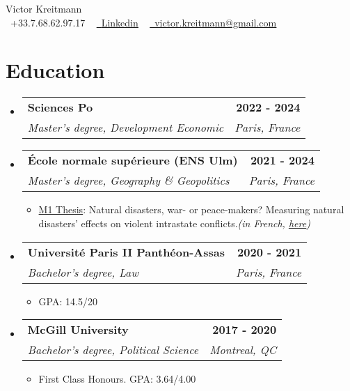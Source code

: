 \documentclass[a4paper,11pt]{article}
\makeatletter
\newcommand{\resumeItem}[1]{
  \item\small{
    {#1 \vspace{-2pt}}
  }
}
\newcommand{\resumeSubheading}[4]{
  \vspace{-2pt}\item
    \begin{tabular*}{1.00\textwidth}[t]{l@{\extracolsep{\fill}}r}
      \textbf{{\small #1}} & {{\textbf{\small #2}}} \\
      \textit{\small#3} & \textit{\small #4} \\
    \end{tabular*}\vspace{-7pt}
}
\newcommand{\resumeSubHeadingListStart}{\begin{itemize}[leftmargin=0.0in, label={}]}
\newcommand{\resumeSubHeadingListEnd}{\end{itemize}}
\newcommand{\resumeItemListStart}{\begin{itemize}}
\newcommand{\resumeItemListEnd}{\end{itemize}\vspace{-5pt}}
\makeatother
\begin{document}

\begin{center}
    {\Huge \upshape Victor Kreitmann} \\ \vspace{1pt}
    \small \raisebox{-0.1\height}\faPhone\ +33.7.68.62.97.17 ~
    \href{https://www.linkedin.com/in/victor-kreitmann/}{\raisebox{-0.2\height}\faLinkedin\ \underline{Linkedin}}  ~    
    \href{mailto:victor.kreitmann@gmail.com}{\raisebox{-0.2\height}\faEnvelope\  \underline{victor.kreitmann@gmail.com}} ~ 
    \vspace{0pt}
\end{center}




\section{Education}
  \resumeSubHeadingListStart
    \resumeSubheading
      {Sciences Po}{2022 - 2024}
      {Master's degree, Development Economic}{Paris, France}
      
      \resumeSubheading
      {École normale supérieure (ENS Ulm)}{2021 - 2024}
      {Master's degree, Geography \& Geopolitics}{Paris, France}
      \resumeItemListStart
      \resumeItem{\underline{M1 Thesis}: Natural disasters, war- or peace-makers? Measuring natural disasters' effects on violent intrastate conflicts.\emph{(in French, \href{https://drive.google.com/file/d/1O6ke_2wZjExpSnBBnSKN7shPb0E3ZBgg/view?usp=sharing}{\underline{here}})}}
      \resumeItemListEnd
      
      \resumeSubheading
      {Université Paris II Panthéon-Assas}{2020 - 2021}
      {Bachelor's degree, Law}{Paris, France}
      \resumeItemListStart
      \resumeItem{GPA: 14.5/20}
      \resumeItemListEnd
      
      \resumeSubheading
      {McGill University}{2017 - 2020}
      {Bachelor's degree, Political Science}{Montreal, QC}
      \resumeItemListStart
      \resumeItem{First Class Honours. GPA: 3.64/4.00}
      \resumeItemListEnd
  \resumeSubHeadingListEnd
\vspace{-10pt}
\end{document}
